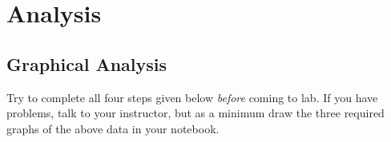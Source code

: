
\section*{Analysis}
\subsection*{Graphical Analysis}
Try to complete all four steps given below {\em before} coming to lab.
If you have problems, talk to your instructor, but as a minimum
draw the three required graphs of the above data in your notebook.



